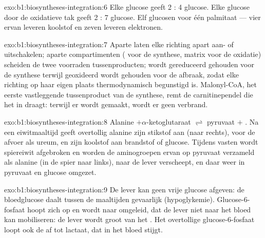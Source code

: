 \begin{solution}{exo:b1:biosyntheses-integration:6}
Elke glucose geeft 2 : 4 glucose. Elke glucose door de oxidatieve tak
geeft 2 : 7 glucose. Elf glucosen voor één palmitaat --- vier ervan leveren
koolstof en zeven leveren elektronen.
\end{solution}

\begin{solution}{exo:b1:biosyntheses-integration:7}
Aparte  laten elke richting apart aan- of uitschakelen; aparte
compartimenten ( voor de synthese, matrix voor de oxidatie) scheiden de twee
voorraden tussenproducten;  wordt gereduceerd gehouden voor de synthese
terwijl  geoxideerd wordt gehouden voor de afbraak, zodat elke richting op haar
eigen plaats thermodynamisch begunstigd is. Malonyl-CoA, het eerste vastleggende
tussenproduct van de synthese, remt de carnitinependel die  het
 in draagt: terwijl er  wordt gemaakt, wordt er geen verbrand.
\end{solution}

\begin{solution}{exo:b1:biosyntheses-integration:8}
Alanine $+ \alpha$-ketoglutaraat $\rightleftharpoons$ pyruvaat $+$ . Na
een eiwitmaaltijd geeft overtollig alanine zijn stikstof aan  (naar
rechts), voor de afvoer als ureum, en zijn koolstof aan brandstof of glucose.
Tijdens vasten wordt spiereiwit afgebroken en worden de aminogroepen ervan op
pyruvaat verzameld als alanine (in de spier naar links), naar de lever verscheept,
en daar weer in pyruvaat en glucose omgezet.
\end{solution}

\begin{solution}{exo:b1:biosyntheses-integration:9}
De lever kan geen vrije glucose afgeven: de bloedglucose daalt tussen de maaltijden
gevaarlijk (hypoglykemie). Glucose-6-fosfaat hoopt zich op en wordt naar 
omgeleid, dat de lever niet naar het bloed kan mobiliseren: de lever wordt groot
van het . Het overtollige glucose-6-fosfaat loopt ook de  af tot
lactaat, dat in het bloed stijgt.
\end{solution}

